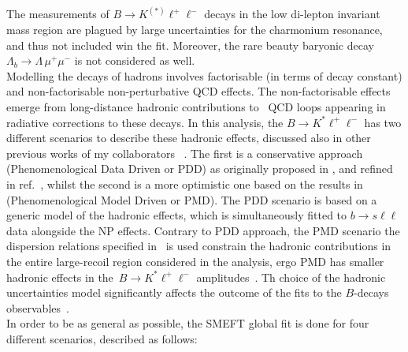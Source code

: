 The measurements of  $B\to K^{(*)}\ell^+\ell^-$ decays in the low di-lepton invariant mass region are plagued by large uncertainties for the charmonium resonance, and thus not included win the fit.  Moreover, the rare beauty baryonic decay $\Lambda_{b} \to  \Lambda \, \mu^{+} \mu^{-}$  is not considered as well. \\  Modelling the decays of hadrons involves factorisable (in terms of decay constant) and non-factorisable non-perturbative QCD effects. The non-factorisable effects emerge from long-distance hadronic contributions to~\cite{Khodjamirian:2010vf,Jager:2014rwa,Lyon:2014hpa} QCD loops appearing in radiative corrections to these decays. In this analysis, the  $B\to K^*\ell^+\ell^-$ has two different scenarios to describe these hadronic effects, discussed also in other previous works of my collaborators ~\cite{Ciuchini:2016weo,Ciuchini:2017mik,Ciuchini:2017gva,Ciuchini:2018xll,Ciuchini:2018anp,Ciuchini:2019usw}. The first is a conservative approach (Phenomenological Data Driven or PDD) as originally proposed in \cite{Ciuchini:2015qxb}, and refined in ref.~\cite{Ciuchini:2018anp}, whilst the second is a more optimistic one based on the results in~\cite{Khodjamirian:2010vf} (Phenomenological Model Driven or PMD). The PDD scenario is based on a generic model of the hadronic effects, which is simultaneously fitted to $b \to s \ell \ell$ data alongside the NP effects. Contrary to PDD approach, the PMD scenario the dispersion relations specified in~\cite{Khodjamirian:2010vf} is used constrain the hadronic contributions in the entire large-recoil region considered in the analysis, ergo PMD has smaller hadronic effects in the~$B\to K^*\ell^+\ell^-$ amplitudes~\cite{Ciuchini:2016weo}. Th choice of the hadronic uncertainties model significantly affects the outcome of the  fits to the $B$-decays observables~\cite{Ciuchini:2019usw}. \\ In order to be as general as possible, the SMEFT global fit is done for four different scenarios, described as follows:
